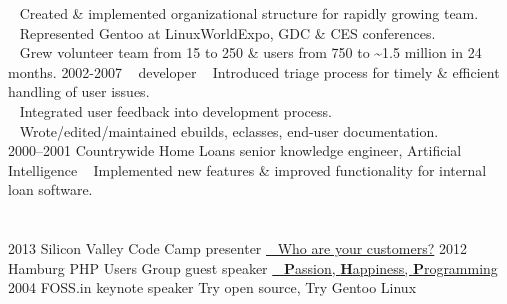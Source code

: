 \documentclass[]{friggeri-cv} %
\begin{document}
\begin{entrylist}
{{\tiny {}} ~  Created \& implemented organizational structure for rapidly growing team.\\
{\tiny {}} ~ Represented Gentoo at LinuxWorldExpo, GDC \& CES conferences.\\
{\tiny {}} ~ Grew volunteer team from 15 to 250 \& users from 750 to \sim 1.5 million in 24 months.}
\entry
{2002-2007}
{~}
{developer}
{{\tiny {}} ~ Introduced triage process for timely \& efficient handling of user issues.\\
{\tiny {}} ~ Integrated user feedback into development process.\\
{\tiny {}} ~ Wrote/edited/maintained ebuilds, eclasses, end-user documentation.\\
}
\entry
{2000--2001}
{Countrywide Home Loans}
{senior knowledge engineer, Artificial Intelligence}
{{\tiny {}} ~ Implemented new features \& improved functionality for internal loan software.}
\end{entrylist}

\section{{} {} {\normalsize {}}}

\begin{entrylist}
\entry
{2013}
{Silicon Valley Code Camp}
{presenter}
{\href{http://www.siliconvalley-codecamp.com/Session/2013/who-are-your-customers}{{\tiny \color{LightGray}} ~ Who are your customers?}}
\entry
{2012}
{Hamburg PHP Users Group}
{guest speaker}
{\href{https://speakerdeck.com/seemantk/developing-with-passion}{{\tiny \color{LightGray}} ~  \textbf{P}assion, \textbf{H}appiness, \textbf{P}rogramming}}
\entry
{2004}
{FOSS.in}
{keynote speaker}
{Try open source, Try Gentoo Linux}
\end{entrylist}
\end{document}
